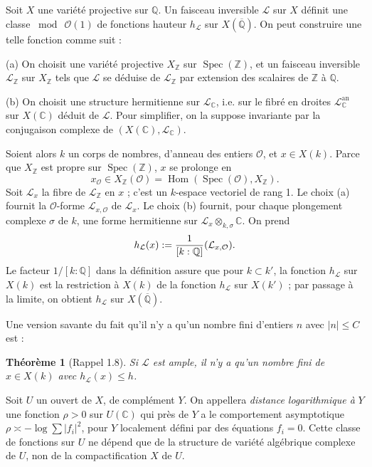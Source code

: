 \documentclass[12pt,a4paper]{article}
\theoremstyle{plain}
\newtheorem{theorem}{Théorème}[section]
\theoremstyle{definition}
\theoremstyle{remark}
\DeclareMathOperator{\Spec}{Spec}
\DeclareMathOperator{\Hom}{Hom}
\newcommand{\CC}{\mathbb{C}}
\newcommand{\QQ}{\mathbb{Q}}
\newcommand{\ZZ}{\mathbb{Z}}
\newcommand{\cO}{\mathcal{O}}
\newcommand{\cL}{\mathcal{L}}
\let\deg\relax
\providecommand{\CC}{\mathbb{C}}
\providecommand{\QQ}{\mathbb{Q}}
\providecommand{\ZZ}{\mathbb{Z}}
\providecommand{\cL}{\mathcal{L}}
\providecommand{\cO}{\mathcal{O}}
\providecommand{\Hom}{\operatorname{Hom}}
\providecommand{\Spec}{\operatorname{Spec}}
\begin{document}
\subsection{}

Soit $X$ une variété projective sur $\QQ$. Un faisceau inversible $\cL$ sur $X$ définit une classe $\bmod\ \cO(1)$ de fonctions hauteur $h_{\cL}$ sur $X(\overline{\QQ})$. On peut construire une telle fonction comme suit :

(a) On choisit une variété projective $X_{\ZZ}$ sur $\Spec(\ZZ)$, et un faisceau inversible $\cL_{\ZZ}$ sur $X_{\ZZ}$ tels que $\cL$ se déduise de $\cL_{\ZZ}$ par extension des scalaires de $\ZZ$ à $\QQ$.

(b) On choisit une structure hermitienne sur $\cL_\CC$, i.e. sur le fibré en droites $\cL_\CC^{\text{an}}$ sur $X(\CC)$ déduit de $\cL$. Pour simplifier, on la suppose invariante par la conjugaison complexe de $(X(\CC), \cL_\CC)$.

Soient alors $k$ un corps de nombres, d'anneau des entiers $\cO$, et $x \in X(k)$. Parce que $X_{\ZZ}$ est propre sur $\Spec(\ZZ)$, $x$ se prolonge en
\[
x_\cO \in X_{\ZZ}(\cO) = \Hom(\Spec(\cO), X_{\ZZ}).
\]
Soit $\cL_x$ la fibre de $\cL_{\ZZ}$ en $x$ ; c'est un $k$-espace vectoriel de rang 1. Le choix (a) fournit la $\cO$-forme $\cL_{x,\cO}$ de $\cL_x$. Le choix (b) fournit, pour chaque plongement complexe $\sigma$ de $k$, une forme hermitienne sur $\cL_x \otimes_{k,\sigma} \CC$. On prend
\[
h_{\cL}(x) := \frac{1}{[k:\QQ]} \deg(\cL_{x,\cO}).
\]
Le facteur $1/[k:\QQ]$ dans la définition assure que pour $k \subset k'$, la fonction $h_{\cL}$ sur $X(k)$ est la restriction à $X(k)$ de la fonction $h_{\cL}$ sur $X(k')$ ; par passage à la limite, on obtient $h_{\cL}$ sur $X(\overline{\QQ})$.

Une version savante du fait qu'il n'y a qu'un nombre fini d'entiers $n$ avec $|n| \leq C$ est :

\begin{theorem}[Rappel 1.8]
Si $\cL$ est ample, il n'y a qu'un nombre fini de $x \in X(k)$ avec $h_{\cL}(x) \leq h$.
\end{theorem}

Soit $U$ un ouvert de $X$, de complément $Y$. On appellera \emph{distance logarithmique à} $Y$ une fonction $\rho > 0$ sur $U(\CC)$ qui près de $Y$ a le comportement asymptotique $\rho \asymp -\log \sum |f_i|^2$, pour $Y$ localement défini par des équations $f_i = 0$. Cette classe de fonctions sur $U$ ne dépend que de la structure de variété algébrique complexe de $U$, non de la compactification $X$ de $U$.
\end{document}
